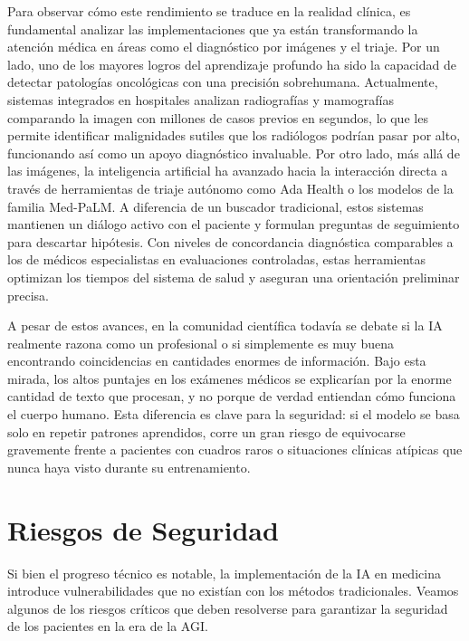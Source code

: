 \documentclass[10pt,a4paper]{article}
\begin{document}
Para observar cómo este rendimiento se traduce en la realidad clínica, es fundamental analizar las implementaciones que ya están transformando la atención médica en áreas como el diagnóstico por imágenes y el triaje. Por un lado, uno de los mayores logros del aprendizaje profundo ha sido la capacidad de detectar patologías oncológicas con una precisión sobrehumana. Actualmente, sistemas integrados en hospitales analizan radiografías y mamografías comparando la imagen con millones de casos previos en segundos, lo que les permite identificar malignidades sutiles que los radiólogos podrían pasar por alto, funcionando así como un apoyo diagnóstico invaluable. Por otro lado, más allá de las imágenes, la inteligencia artificial ha avanzado hacia la interacción directa a través de herramientas de triaje autónomo como Ada Health o los modelos de la familia Med-PaLM. A diferencia de un buscador tradicional, estos sistemas mantienen un diálogo activo con el paciente y formulan preguntas de seguimiento para descartar hipótesis. Con niveles de concordancia diagnóstica comparables a los de médicos especialistas en evaluaciones controladas, estas herramientas optimizan los tiempos del sistema de salud y aseguran una orientación preliminar precisa.


A pesar de estos avances, en la comunidad científica todavía se debate si la IA realmente razona como un profesional o si simplemente es muy buena encontrando coincidencias en cantidades enormes de información. Bajo esta mirada, los altos puntajes en los exámenes médicos se explicarían por la enorme cantidad de texto que procesan, y no porque de verdad entiendan cómo funciona el cuerpo humano. Esta diferencia es clave para la seguridad: si el modelo se basa solo en repetir patrones aprendidos, corre un gran riesgo de equivocarse gravemente frente a pacientes con cuadros raros o situaciones clínicas atípicas que nunca haya visto durante su entrenamiento.


\section{Riesgos de Seguridad}
Si bien el progreso técnico es notable, la implementación de la IA en medicina introduce vulnerabilidades que no existían con los métodos tradicionales. Veamos algunos de los riesgos críticos que deben resolverse para garantizar la seguridad de los pacientes en la era de la AGI.
\end{document}
